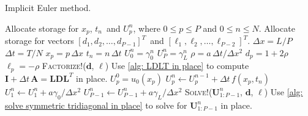 \begin{algorithm}
\caption{Implicit Euler method.}
\label{alg: implicit Euler}
\begin{algorithmic}
\State Allocate storage for $x_p$, $t_n$~and $U^n_p$, where $0\le p\le P$ and 
$0\le n\le N$.
\State Allocate storage for vectors $[d_1,d_2,\ldots,d_{P-1}]^T$~and
$[\ell_1,\ell_2,\ldots,\ell_{P-2}]^T$.
\State $\Delta x=L/P$ 
\State$\Delta t=T/N$
    \State $x_p=p\,\Delta x$
\EndFor
{}
    \State $t_n=n\,\Delta t$
    \State $U^n_0=\gamma_0^n$
    \State $U^n_P=\gamma_L^n$
\EndFor
\State $\rho=a\,\Delta t/\Delta x^2$
    \State $d_p=1+2\rho$
\EndFor
{}
    \State $\ell_p=-\rho$
\EndFor
\State \textsc{Factorize!}($\boldsymbol{d}$, $\boldsymbol{\ell}$)
\Comment Use \cref{alg: LDLT in place} to compute
$\boldsymbol{I}+\Delta t\,\boldsymbol{A}=\boldsymbol{L}\boldsymbol{D}
\boldsymbol{L}^T$ in place.
    \State $U^0_p=u_0(x_p)$
\EndFor
{}
        \State $U^n_p\gets U^{n-1}_p+\Delta t\,f(x_p,t_n)$
    \EndFor
    \State $U^n_1\gets U^n_1+a\gamma_0/\Delta x^2$
    \State $U^n_{P-1}\gets U^n_{P-1}+a\gamma_L/\Delta x^2$
    \State \textsc{Solve}!($\boldsymbol{U}^n_{1:P-1}$,
$\boldsymbol{d}$, $\boldsymbol{\ell}$)
\Comment Use \cref{alg: solve symmetric tridiagonal in place} to solve
for $\boldsymbol{U}^n_{1:P-1}$ in place.
\EndFor
\end{algorithmic}
\end{algorithm}

